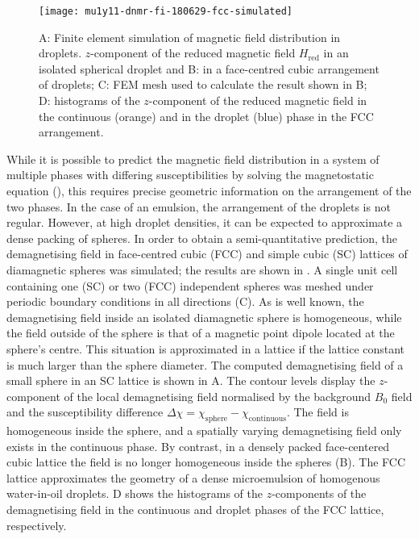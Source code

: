 \begin{figure}[h]
  \begin{center}
    \texttt{[image: mu1y11-dnmr-fi-180629-fcc-simulated]}
  \end{center}
  \caption{A: Finite element simulation of magnetic field distribution in droplets.
      $z$-component of the reduced magnetic field $H_\text{red}$ in an isolated spherical droplet
      and B: in a face-centred cubic arrangement of droplets; C: FEM mesh used
      to calculate the result shown in B; D: histograms of the $z$-component
      of the reduced magnetic field in the continuous (orange) and in the droplet (blue) phase
      in the FCC arrangement.
    }
  \label{fig:FEM-fcc}
\end{figure}


While it is possible to predict the magnetic field distribution in a system of
multiple phases with differing susceptibilities by solving the magnetostatic
equation (), this requires precise geometric information on the arrangement of the
two phases. In the case of an emulsion, the arrangement of the droplets is not
regular. However, at high droplet densities, it can be
expected to approximate  a dense packing of spheres. In order to obtain a
semi-quantitative prediction, the demagnetising field in
face-centred cubic  (FCC) and simple cubic (SC) lattices of diamagnetic spheres was simulated;
the results are shown in  . A single unit cell containing
one (SC) or
two (FCC) independent spheres was meshed under periodic boundary conditions in all
directions (C).
As is well known, the demagnetising field inside an isolated diamagnetic sphere
is homogeneous, while the field outside of the
sphere is that of a magnetic
point dipole located at the sphere's centre. This situation is approximated
in a lattice if the lattice constant is much larger than the sphere
diameter. The computed demagnetising field
of a small sphere in an SC lattice is shown in A.
The contour levels display the $z$-component of the local demagnetising field
normalised by the background $B_0$ field and the susceptibility difference
$\Delta\chi= \chi_\text{sphere}-\chi_\text{continuous}$. The field is homogeneous
inside the sphere, and a spatially varying demagnetising field only
exists in the continuous phase.
By contrast, in a
densely packed face-centered cubic lattice the field is no
longer homogeneous inside the spheres (B). The FCC
lattice approximates the geometry of a dense microemulsion of homogenous
water-in-oil droplets.  D shows the histograms of
the $z$-components of
the demagnetising field in the continuous and droplet phases of the FCC
lattice, respectively.


